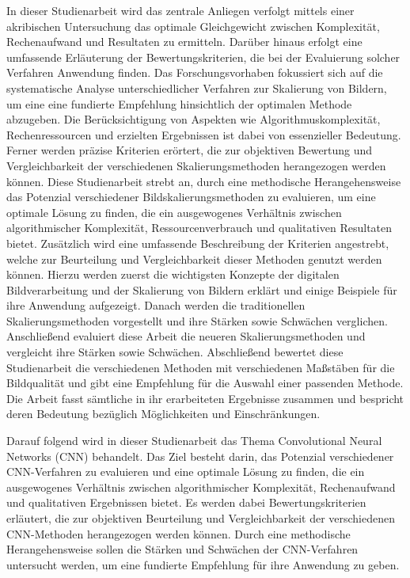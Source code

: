     In dieser Studienarbeit wird das zentrale Anliegen verfolgt mittels einer akribischen Untersuchung das optimale Gleichgewicht zwischen Komplexität, Rechenaufwand und Resultaten zu ermitteln. 
    Darüber hinaus erfolgt eine umfassende Erläuterung der Bewertungskriterien, die bei der Evaluierung solcher Verfahren Anwendung finden. 
    Das Forschungsvorhaben fokussiert sich auf die systematische Analyse unterschiedlicher Verfahren zur Skalierung von Bildern, um eine eine fundierte Empfehlung hinsichtlich der optimalen Methode abzugeben. 
    Die Berücksichtigung von Aspekten wie Algorithmuskomplexität, Rechenressourcen und erzielten Ergebnissen ist dabei von essenzieller Bedeutung. 
    Ferner werden präzise Kriterien erörtert, die zur objektiven Bewertung und Vergleichbarkeit der verschiedenen Skalierungsmethoden herangezogen werden können.
    Diese Studienarbeit strebt an, durch eine methodische Herangehensweise das Potenzial verschiedener Bildskalierungsmethoden zu evaluieren, um eine optimale Lösung zu finden, die ein ausgewogenes Verhältnis zwischen algorithmischer Komplexität, Ressourcenverbrauch und qualitativen Resultaten bietet. 
    Zusätzlich wird eine umfassende Beschreibung der Kriterien angestrebt, welche zur Beurteilung und Vergleichbarkeit dieser Methoden genutzt werden können.
    Hierzu werden zuerst die wichtigsten Konzepte der digitalen Bildverarbeitung und der Skalierung von Bildern erklärt und einige Beispiele für ihre Anwendung aufgezeigt. 
    Danach werden die traditionellen Skalierungsmethoden vorgestellt und  ihre Stärken sowie Schwächen verglichen. 
    Anschließend evaluiert diese Arbeit die neueren Skalierungsmethoden und vergleicht ihre Stärken sowie Schwächen. 
    Abschließend bewertet diese Studienarbeit die verschiedenen Methoden mit verschiedenen Maßstäben für die Bildqualität und gibt eine Empfehlung für die Auswahl einer passenden Methode. 
    Die Arbeit fasst sämtliche in ihr erarbeiteten Ergebnisse zusammen und bespricht deren Bedeutung bezüglich Möglichkeiten und Einschränkungen.

    Darauf folgend wird in dieser Studienarbeit das Thema Convolutional Neural Networks (CNN) behandelt.
    Das Ziel besteht darin, das Potenzial verschiedener CNN-Verfahren zu evaluieren und eine optimale Lösung zu finden, die ein ausgewogenes Verhältnis zwischen algorithmischer Komplexität, Rechenaufwand und qualitativen Ergebnissen bietet.
    Es werden dabei Bewertungskriterien erläutert, die zur objektiven Beurteilung und Vergleichbarkeit der verschiedenen CNN-Methoden herangezogen werden können.
    Durch eine methodische Herangehensweise sollen die Stärken und Schwächen der CNN-Verfahren untersucht werden, um eine fundierte Empfehlung für ihre Anwendung zu geben.
    \newpage
